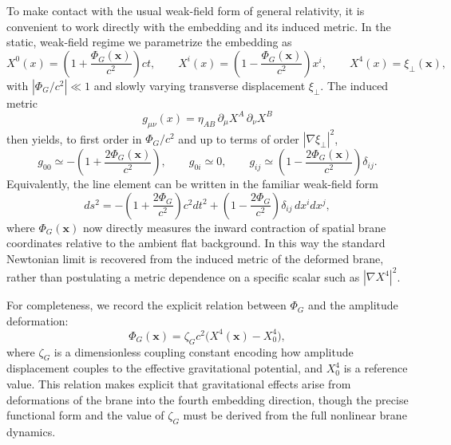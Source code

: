 To make contact with the usual weak-field form of general relativity,
it is convenient to work directly with the embedding and its induced
metric. In the static, weak-field regime we parametrize the embedding as
\begin{equation}
  X^0(x) = \left(1 + \frac{\Phi_G(\mathbf x)}{c^2}\right) c t,
  \qquad
  X^i(x) = \left(1 - \frac{\Phi_G(\mathbf x)}{c^2}\right) x^i,
  \qquad
  X^4(x) = \xi_\perp(\mathbf x),
\end{equation}
with $|\Phi_G/c^2|\ll 1$ and slowly varying transverse displacement
$\xi_\perp$. The induced metric
\begin{equation}
  g_{\mu\nu}(x) = \eta_{AB}\,\partial_\mu X^A\,\partial_\nu X^B
\end{equation}
then yields, to first order in $\Phi_G/c^2$ and up to terms of order
$|\nabla \xi_\perp|^2$,
\begin{equation}
  g_{00} \simeq -\left(1 + \frac{2\Phi_G(\mathbf x)}{c^2}\right),
  \qquad
  g_{0i} \simeq 0,
  \qquad
  g_{ij} \simeq \left(1 - \frac{2\Phi_G(\mathbf x)}{c^2}\right)\delta_{ij}.
\end{equation}
Equivalently, the line element can be written in the familiar
weak-field form
\begin{equation}
  ds^2 = -\left(1 + \frac{2\Phi_G}{c^2}\right)c^2 dt^2
         + \left(1 - \frac{2\Phi_G}{c^2}\right)\delta_{ij}\,dx^i dx^j,
  \label{eq:weak_field_GR_metric}
\end{equation}
where $\Phi_G(\mathbf x)$ now directly measures the inward contraction
of spatial brane coordinates relative to the ambient flat background.
In this way the standard Newtonian limit is recovered from the induced
metric of the deformed brane, rather than postulating a metric
dependence on a specific scalar such as $|\nabla X^4|^2$.

For completeness, we record the explicit relation between $\Phi_G$ and the amplitude deformation:
\begin{equation}
  \Phi_G(\mathbf x) = \zeta_G c^2 \bigl(X^4(\mathbf x) - X^4_0\bigr),
  \label{eq:PhiG_from_gradX4}
\end{equation}
where $\zeta_G$ is a dimensionless coupling constant encoding how amplitude displacement couples to the effective gravitational potential, and $X^4_0$ is a reference value. This relation makes explicit that gravitational effects arise from deformations of the brane into the fourth embedding direction, though the precise functional form and the value of $\zeta_G$ must be derived from the full nonlinear brane dynamics.

